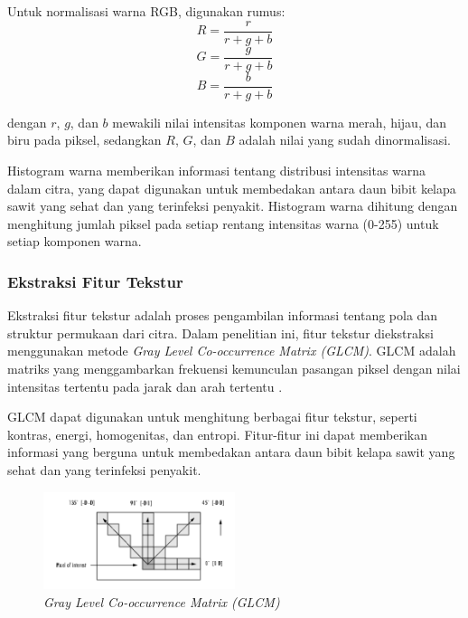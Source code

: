Untuk normalisasi warna RGB, digunakan rumus:
\begin{equation}
	R = \frac{r}{r+g+b} \label{eq:norm-r}
\end{equation}
\begin{equation}
	G = \frac{g}{r+g+b} \label{eq:norm-g}
\end{equation}
\begin{equation}
	B = \frac{b}{r+g+b} \label{eq:norm-b}
\end{equation}
\noindent

dengan $r$, $g$, dan $b$ mewakili nilai intensitas komponen warna merah, hijau, dan biru pada piksel, sedangkan $R$, $G$, dan $B$ adalah nilai yang sudah dinormalisasi.

Histogram warna memberikan informasi tentang distribusi intensitas warna dalam citra, yang dapat digunakan untuk membedakan antara daun bibit kelapa sawit yang sehat dan yang terinfeksi penyakit. Histogram warna dihitung dengan menghitung jumlah piksel pada setiap rentang intensitas warna (0-255) untuk setiap komponen warna.

\subsubsection{Ekstraksi Fitur Tekstur} \label{II.Ekstraksi Fitur Tektur}
Ekstraksi fitur tekstur adalah proses pengambilan informasi tentang pola dan struktur permukaan dari citra. Dalam penelitian ini, fitur tekstur diekstraksi menggunakan metode \textit{Gray Level Co-occurrence Matrix (GLCM)}. GLCM adalah matriks yang menggambarkan frekuensi kemunculan pasangan piksel dengan nilai intensitas tertentu pada jarak dan arah tertentu \cite{sinaga2024klasifikasi}.

GLCM dapat digunakan untuk menghitung berbagai fitur tekstur, seperti kontras, energi, homogenitas, dan entropi. Fitur-fitur ini dapat memberikan informasi yang berguna untuk membedakan antara daun bibit kelapa sawit yang sehat dan yang terinfeksi penyakit.

\begin{figure}[H]
	\centering
	\includegraphics[width=0.5\textwidth]{figure/chapter-2-GLCM.png}
	\caption{\textit{Gray Level Co-occurrence Matrix (GLCM)}}
	\label{fig:2.GLCM}
\end{figure}

